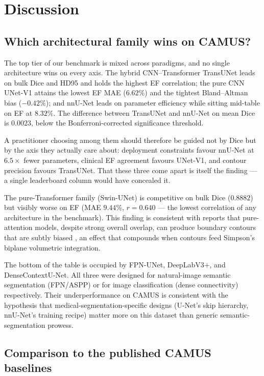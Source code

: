 \section{Discussion}
\label{sec:discussion}

\subsection{Which architectural family wins on CAMUS?}
\label{sec:disc-families}

The top tier of our benchmark is mixed across paradigms, and no single
architecture wins on every axis. The hybrid CNN--Transformer TransUNet leads on
bulk Dice and HD95 and holds the highest EF correlation; the pure CNN UNet-V1
attains the lowest EF MAE ($6.62\%$) and the tightest Bland--Altman bias
($-0.42\%$); and nnU-Net leads on parameter efficiency while sitting mid-table
on EF at $8.32\%$. The difference between TransUNet and nnU-Net on mean Dice is
$0.0023$, below the Bonferroni-corrected significance threshold.

A practitioner choosing among them should therefore be guided not by Dice but
by the axis they actually care about: deployment constraints favour nnU-Net at
$6.5\times$ fewer parameters, clinical EF agreement favours UNet-V1, and
contour precision favours TransUNet. That these three come apart is itself the
finding --- a single leaderboard column would have concealed it.

The pure-Transformer family (Swin-UNet) is competitive on bulk Dice
($0.8882$) but visibly worse on EF (MAE $9.44\%$, $r = 0.640$ --- the lowest
correlation of any architecture in the benchmark). This
finding is consistent with reports that pure-attention models, despite
strong overall overlap, can produce boundary contours that are subtly
biased \citep{chen2021transunet}, an effect that compounds when
contours feed Simpson's biplane volumetric integration.

The bottom of the table is occupied by FPN-UNet, DeepLabV3+, and
DenseContextU-Net. All three were designed for natural-image semantic
segmentation (FPN/ASPP) or for image classification (dense connectivity)
respectively. Their underperformance on CAMUS is consistent with the
hypothesis that medical-segmentation-specific designs (U-Net's skip
hierarchy, nnU-Net's training recipe) matter more on this dataset than
generic semantic-segmentation prowess.

\subsection{Comparison to the published CAMUS baselines}
\label{sec:disc-leaderboard}

